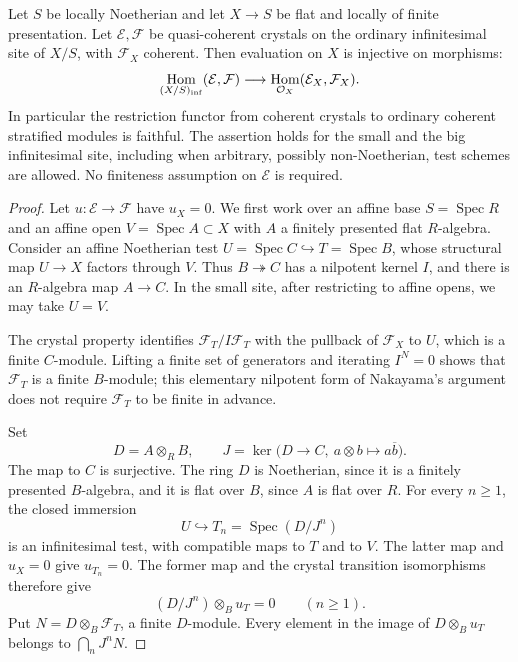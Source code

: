 \documentclass[11pt]{article}
\newcommand{\OO}{\mathcal O}\newcommand{\Fp}{\mathbf F_p}
\DeclareMathOperator{\Spec}{Spec}\DeclareMathOperator{\Hom}{Hom}
\theoremstyle{definition}\newtheorem{definition}[theorem]{Definition}
\theoremstyle{remark}\newtheorem{remark}[theorem]{Remark}
\begin{document}
\begin{proposition}\label{prop:faithfulness}
Let $S$ be locally Noetherian and let $X\to S$ be flat and locally of finite presentation.  Let $\mathcal E,\mathcal F$ be quasi-coherent crystals on the ordinary infinitesimal site of $X/S$, with $\mathcal F_X$ coherent.  Then evaluation on $X$ is injective on morphisms:
\[
 \Hom_{(X/S)_{\rm inf}}(\mathcal E,\mathcal F)
       \longrightarrow \Hom_{\OO_X}(\mathcal E_X,\mathcal F_X).
\]
In particular the restriction functor from coherent crystals to ordinary coherent stratified modules is faithful.  The assertion holds for the small and the big infinitesimal site, including when arbitrary, possibly non-Noetherian, test schemes are allowed.  No finiteness assumption on $\mathcal E$ is required.
\end{proposition}
\begin{proof}
Let $u:\mathcal E\to\mathcal F$ have $u_X=0$.  We first work over an affine base $S=\Spec R$ and an affine open $V=\Spec A\subset X$ with $A$ a finitely presented flat $R$-algebra.  Consider an affine Noetherian test $U=\Spec C\hookrightarrow T=\Spec B$, whose structural map $U\to X$ factors through $V$.  Thus $B\twoheadrightarrow C$ has a nilpotent kernel $I$, and there is an $R$-algebra map $A\to C$.  In the small site, after restricting to affine opens, we may take $U=V$.

The crystal property identifies $\mathcal F_T/I\mathcal F_T$ with the pullback of $\mathcal F_X$ to $U$, which is a finite $C$-module.  Lifting a finite set of generators and iterating $I^N=0$ shows that $\mathcal F_T$ is a finite $B$-module; this elementary nilpotent form of Nakayama's argument does not require $\mathcal F_T$ to be finite in advance.

Set
\[
 D=A\otimes_R B,\qquad
 J=\ker\bigl(D\longrightarrow C,\ a\otimes b\longmapsto a\overline b\bigr).
\]
The map to $C$ is surjective.  The ring $D$ is Noetherian, since it is a finitely presented $B$-algebra, and it is flat over $B$, since $A$ is flat over $R$.  For every $n\geq1$, the closed immersion
\[
 U\hookrightarrow T_n=\Spec(D/J^n)
\]
is an infinitesimal test, with compatible maps to $T$ and to $V$.  The latter map and $u_X=0$ give $u_{T_n}=0$.  The former map and the crystal transition isomorphisms therefore give
\[
 (D/J^n)\otimes_B u_T=0\qquad(n\geq1).
\]
Put $N=D\otimes_B\mathcal F_T$, a finite $D$-module.  Every element in the image of $D\otimes_B u_T$ belongs to $\bigcap_nJ^nN$.


\end{proof}
\end{document}
